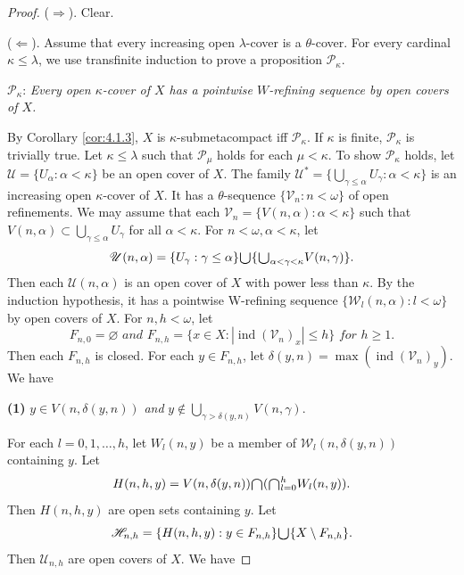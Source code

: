 \documentclass[main.tex]{subfiles}
\begin{document}
\begin{proof} 
($\Rightarrow$). Clear.

($\Leftarrow$). Assume that every increasing open $\lambda$-cover is a 
$\theta$-cover. 
 For every cardinal $\kappa \le \lambda$,
we use transfinite induction to prove a proposition  $\mathcal{P}_\kappa$.

$\mathcal{P}_\kappa$: \textit{Every open $\kappa$-cover of $X$ has a pointwise $W$-refining 
sequence by open covers of $X$.}

\noindent By Corollary \ref{cor:4.1.3}, $X$ is $\kappa$-submetacompact iff $\mathcal{P}_\kappa$. 
If $\kappa$ is finite, $\mathcal{P}_\kappa$ is trivially true.
Let $\kappa \le \lambda$ such that $\mathcal{P}_\mu$ holds for each $\mu < \kappa$.
To show $\mathcal{P}_\kappa$ holds, let $\mathscr{U} = \{U_\alpha: \alpha < \kappa\}$ be an open 
cover of $X$. The family $\mathscr{U}^*=\{\bigcup_{\gamma\le\alpha}U_\gamma: \alpha < \kappa\}$ 
is an increasing open $\kappa$-cover of $X$. 
It has a $\theta$-sequence $\{\mathscr{V}_n: n < \omega\}$ of open refinements. 
We may assume that each $\mathscr{V}_n = \{V(n, \alpha): \alpha < \kappa\}$ 
such that $V(n, \alpha) \subset \bigcup_{\gamma \le \alpha} U_\gamma$ for all $\alpha < \kappa$. 
For $n < \omega, \alpha < \kappa$, let
$$\mathscr{U}(n, \alpha) = \{U_\gamma: \gamma \le \alpha\} 
\raisebox{-2pt}{\scalebox{1.5}{$\cup$}} 
\{\raisebox{-2pt}{\scalebox{1.5}{$\cup$}}_{\alpha < \gamma < \kappa} V(n, \gamma)\}.$$
\noindent Then each $\mathscr{U}(n, \alpha)$ is an open cover of $X$ with power less than $\kappa$.
By the induction hypothesis, it has a pointwise W-refining sequence 
$\{\mathscr{W}_l(n, \alpha): l < \omega\}$ by open covers of $X$.
For $n, h < \omega$, let 
$$F_{n,0} = \varnothing \textit{ and }
F_{n,h} = \{x \in X: |\operatorname{ind}(\mathscr{V}_n)_x| \le h\} \textit{ for } h \ge 1.$$
Then each $F_{n,h}$ is closed.
 For each $y \in F_{n,h}$, let $\delta(y, n) = \max(\operatorname{ind}(\mathscr{V}_n)_y)$.
We have 

\textbf{(1)} $y \in V(n, \delta(y, n))$ \textit{and} $y\notin \bigcup_{\gamma > \delta(y, n)} V(n, \gamma).$

\noindent For each $l = 0, 1, \dots, h$, let $W_l(n, y)$ be a member of $\mathscr{W}_l(n, \delta(y, n))$ containing $y$.
Let 
$$H(n, h, y) = V(n, \delta(y, n))  \raisebox{-2pt}{\scalebox{1.5}{$\cap$}}
 (\raisebox{-2pt}{\scalebox{1.5}{$\cap$}}_{l=0}^{h} W_l(n, y)).$$ 
\noindent Then $H(n, h, y)$ are open sets containing $y$.
Let 
$$\mathscr{H}_{n,h} = \{H(n, h, y): y \in F_{n,h}\}  \raisebox{-2pt}{\scalebox{1.5}{$\cup$}} \{X \setminus F_{n,h}\}.$$
\noindent Then $\mathscr{U}_{n,h}$ are open covers of $X$.
We have


\end{proof}
\end{document}
